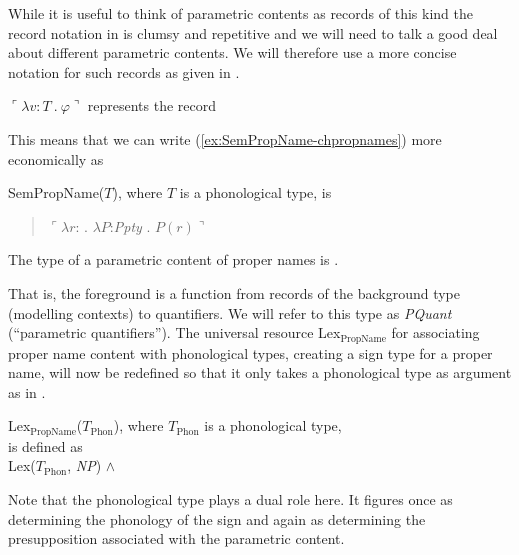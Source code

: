 While it is useful to think of parametric contents as records of this
kind the record notation in \preveg{} is clumsy and repetitive and we
will need to talk a good deal about different parametric contents.  We
will therefore use a more concise notation for such records as given
in \nexteg{}.
\begin{ex} 
  $\ulcorner\lambda v\!:\!T\ .\ \varphi\urcorner$ represents the record
  \begin{quote}
  \end{quote}
\label{ex:cornerquote-notation} 
\end{ex}
This means that we can write (\ref{ex:SemPropName-chpropnames}) more
economically as \nexteg{}
\begin{ex} 
SemPropName($T$), where $T$ is a phonological type,
is
\begin{quote}
$\ulcorner\lambda r$:  . $\lambda
                       P$:\textit{Ppty} . $P(r)\urcorner$
                     \end{quote}
                     
\label{ex:SemPropName-chpropnames-econ} 
\end{ex}
  


The type of a parametric content of proper names is \nexteg{}.
\begin{ex}
\end{ex}
That is, the foreground is a function from
records of the  background type (modelling contexts) to quantifiers.  We will refer to this type as
\textit{PQuant} (``parametric quantifiers'').  The universal resource
Lex$_{\mathrm{PropName}}$ for associating proper name content with
phonological types, creating a sign type for a proper name, will now be
redefined so that it only takes a phonological type as argument as in
\nexteg{}.

\begin{ex} 
Lex$_{\mathrm{PropName}}$($T_{\mathrm{Phon}}$), where
$T_{\mathrm{Phon}}$ is a phonological type,
\\
is defined as \\
Lex($T_{\mathrm{Phon}}$, \textit{NP}) \d{$\wedge$}
\end{ex} 
Note that the phonological type plays a dual role here.  It figures
once as determining the phonology of the sign and again as determining
the presupposition associated with the parametric content.   
  

